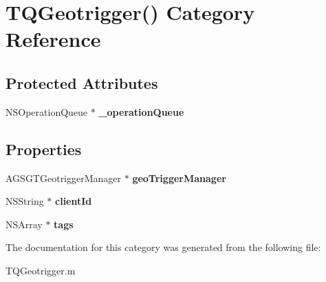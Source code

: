 \hypertarget{category_t_q_geotrigger_07_08}{}\section{T\+Q\+Geotrigger() Category Reference}
\label{category_t_q_geotrigger_07_08}
\subsection*{Protected Attributes}
\begin{DoxyCompactItemize}
\item 
\hypertarget{category_t_q_geotrigger_07_08_a640a33055d6b2f5b884879886f3bb1e6}{}N\+S\+Operation\+Queue $\ast$ {\bfseries \+\_\+operation\+Queue}\label{category_t_q_geotrigger_07_08_a640a33055d6b2f5b884879886f3bb1e6}

\end{DoxyCompactItemize}
\subsection*{Properties}
\begin{DoxyCompactItemize}
\item 
\hypertarget{category_t_q_geotrigger_07_08_aceb60bc09215913c877679b0b550c255}{}A\+G\+S\+G\+T\+Geotrigger\+Manager $\ast$ {\bfseries geo\+Trigger\+Manager}\label{category_t_q_geotrigger_07_08_aceb60bc09215913c877679b0b550c255}

\item 
\hypertarget{category_t_q_geotrigger_07_08_ad19bd59fb71949b171db9b7f5ec1d0a2}{}N\+S\+String $\ast$ {\bfseries client\+Id}\label{category_t_q_geotrigger_07_08_ad19bd59fb71949b171db9b7f5ec1d0a2}

\item 
\hypertarget{category_t_q_geotrigger_07_08_abd4f4d3ffc813e170980fb9732faff20}{}N\+S\+Array $\ast$ {\bfseries tags}\label{category_t_q_geotrigger_07_08_abd4f4d3ffc813e170980fb9732faff20}

\end{DoxyCompactItemize}


The documentation for this category was generated from the following file\+:\begin{DoxyCompactItemize}
\item 
T\+Q\+Geotrigger.\+m\end{DoxyCompactItemize}
